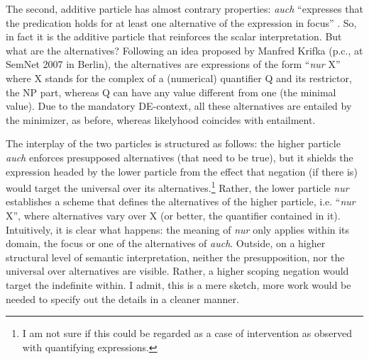 \documentclass[output=paper,colorlinks,citecolor=brown,
]{langscibook}
\begin{document}
The second, additive particle has almost contrary properties: \textit{auch} ``expresses that the
predication holds for at least one alternative of the expression in focus''
\citep[111]{krifka1998}. So, in fact it is the additive particle that reinforces the scalar
interpretation. But what are the alternatives? Following an idea proposed by Manfred Krifka (p.c.,
at SemNet 2007 in Berlin), the alternatives are expressions of the form ``\textit{nur} X'' where X
stands for the complex of a (numerical) quantifier Q and its restrictor, the NP part, whereas Q can
have any value different from one (the minimal value). Due to the mandatory DE-context, all these
alternatives are entailed by the minimizer, as before, whereas likelyhood coincides with entailment.

The interplay of the two particles is structured as follows: the higher particle \textit{auch} enforces presupposed
alternatives (that need to be true), but it shields the expression headed by the lower particle from the effect that
negation (if there is) would target the universal over its alternatives.\footnote{I am not sure if this could be regarded as a
case of intervention as observed with quantifying expressions.} Rather, the lower particle \textit{nur}
establishes a scheme that defines the alternatives of the higher particle, i.e. ``\textit{nur} X'', where alternatives
vary over X (or better, the quantifier contained in it). Intuitively, it is clear what happens: the meaning of
\textit{nur} only applies within its domain, the focus or one of the alternatives of \textit{auch}. Outside, on a
higher structural level of semantic interpretation, neither the presupposition, nor the universal over alternatives are
visible. Rather, a higher scoping negation would target the indefinite within. I admit, this is a mere sketch, more
work would be needed to specify out the details in a cleaner manner.
\end{document}
